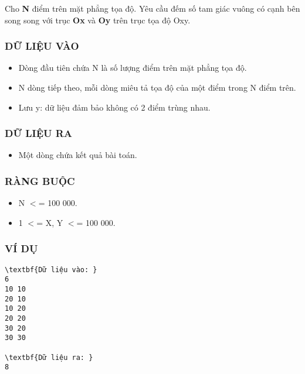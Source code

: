 

Cho \textbf{ N } điểm trên mặt phẳng tọa độ. Yêu cầu đếm số tam giác vuông có cạnh bên song song với trục \textbf{ Ox } và \textbf{ Oy } trên trục tọa độ Oxy.

\subsubsection{DỮ LIỆU VÀO}
\begin{itemize}
	\item Dòng đầu tiên chứa N là số lượng điểm trên mặt phẳng tọa độ.
	\item N dòng tiếp theo, mỗi dòng miêu tả tọa độ của một điểm trong N điểm trên.
	\item Lưu y: dữ liệu đảm bảo không có 2 điểm trùng nhau.
\end{itemize}

\subsubsection{DỮ LIỆU RA}
\begin{itemize}
	\item Một dòng chứa kết quả bài toán.
\end{itemize}

\subsubsection{RÀNG BUỘC}
\begin{itemize}
	\item N $<$= 100 000.
	\item 1 $<$= X, Y $<$= 100 000.
\end{itemize}

\subsubsection{VÍ DỤ}
\begin{verbatim}
\textbf{Dữ liệu vào: }
6
10 10
20 10
10 20
20 20
30 20
30 30

\textbf{Dữ liệu ra: }
8\end{verbatim}